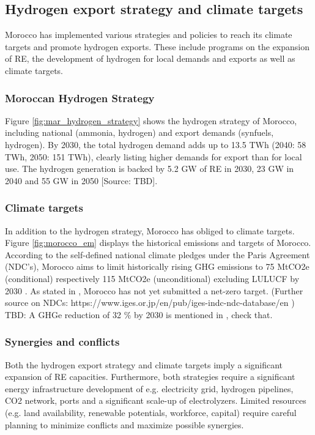 \subsection{Hydrogen export strategy and climate targets}
\label{subsec:policyandtargets}
Morocco has implemented various strategies and policies to reach its climate targets and promote hydrogen exports. These include programs on the expansion of RE, the development of hydrogen for local demands and exports as well as climate targets.


\subsubsection{Moroccan Hydrogen Strategy}
Figure \ref{fig:mar_hydrogen_strategy} shows the hydrogen strategy of Morocco, including
national (ammonia, hydrogen) and export demands (synfuels, hydrogen).
By 2030, the total hydrogen demand adds up to 13.5 TWh (2040: 58 TWh, 2050: 151 TWh), 
clearly listing higher demands for export than for local use. The hydrogen generation is backed by 5.2 GW of RE in 2030, 23 GW in 2040 and 55 GW in 2050 [Source: TBD].

\subsubsection{Climate targets}
In addition to the hydrogen strategy, Morocco has obliged to climate targets.
Figure \ref{fig:morocco_em} displays the historical emissions and targets of Morocco.
According to the self-defined national climate pledges under the Paris Agreement (NDC's), Morocco aims to limit historically rising GHG emissions to 75 MtCO2e (conditional) respectively 115 MtCO2e (unconditional) excluding LULUCF by 2030 \cite{CAT2021}. 
As stated in \cite{CAT2021}, Morocco has not yet submitted a net-zero target. (Further source on NDCs: https://www.iges.or.jp/en/pub/iges-indc-ndc-database/en )
TBD: A GHGe reduction of 32 \% by 2030 is mentioned in \cite[5]{Boulakhbar2020}, check that.

\subsubsection{Synergies and conflicts}
Both the hydrogen export strategy and climate targets imply a significant expansion of RE capacities. Furthermore, both strategies require a significant energy infrastructure development of e.g. electricity grid, hydrogen pipelines, CO2 network, ports and a significant scale-up of electrolyzers.
Limited resources (e.g. land availability, renewable potentials, workforce, capital) require careful planning to minimize conflicts and maximize possible synergies.



